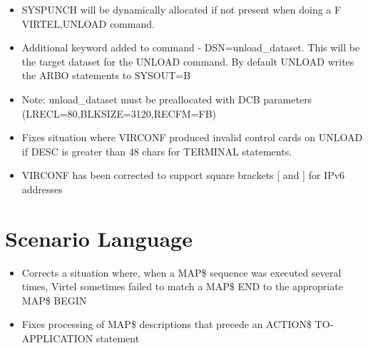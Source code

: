 \documentclass[letterpaper,10pt,english]{sphinxmanual}
\begin{document}
\begin{itemize}
\item {} 
SYSPUNCH will be dynamically allocated if not present when doing a F VIRTEL,UNLOAD command.

\item {} 
Additional keyword added to command - DSN=unload\_dataset. This will be the target dataset for the UNLOAD command. By default UNLOAD writes the ARBO statements to SYSOUT=B

\item {} 
Note: unload\_dataset must be preallocated with DCB parameters (LRECL=80,BLKSIZE=3120,RECFM=FB)

\end{itemize}

\begin{itemize}
\item {} 
Fixes situation where VIRCONF produced invalid control cards on UNLOAD if DESC is greater than 48 chars for TERMINAL statements.

\end{itemize}

\begin{itemize}
\item {} 
VIRCONF has been corrected to support square brackets {[} and {]} for IPv6 addresses

\end{itemize}

\newpage


\section{Scenario Language}
\label{\detokenize{TN202003:scenario-language}}
\begin{itemize}
\item {} 
Corrects a situation where, when a MAP\$ sequence was executed several times, Virtel sometimes failed to match a MAP\$ END to the appropriate MAP\$ BEGIN

\end{itemize}

\begin{itemize}
\item {} 
Fixes processing of MAP\$ descriptions that precede an ACTION\$ TO-APPLICATION statement

\end{itemize}
\end{document}
